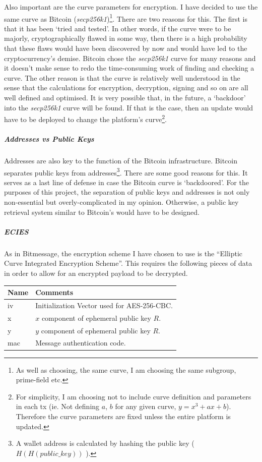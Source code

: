 \documentclass{article}
\begin{document}
Also important are the curve parameters for encryption. I have decided to use the same curve as Bitcoin (\textit{secp256k1}\cite{secp256k1})\footnote{As well as choosing, the same curve, I am choosing the same subgroup, prime-field etc.}. There are two reasons for this. The first is that it has been `tried and tested'. In other words, if the curve were to be majorly, cryptographically flawed in some way, then there is a high probability that these flaws would have been discovered by now and would have led to the cryptocurrency's demise. Bitcoin chose the \textit{secp256k1} curve for many reasons and it doesn't make sense to redo the time-consuming work of finding and checking a curve. The other reason is that the curve is relatively well understood in the sense that the calculations for encryption, decryption, signing and so on are all well defined and optimised. It is very possible that, in the future, a `backdoor' into the \textit{secp256k1} curve will be found. If that is the case, then an update would have to be deployed to change the platform's curve\footnote{For simplicity, I am choosing not to include curve definition and parameters in each tx (ie. Not defining $a$, $b$ for any given curve, $y=x^3+ax+b$). Therefore the curve parameters are fixed unless the entire platform is updated.}.

\subparagraph{Addresses vs Public Keys}\label{subpara:addrsvspubkeys}
Addresses are also key to the function of the Bitcoin infrastructure. Bitcoin separates public keys from addresses\footnote{A wallet address is calculated by hashing the public key ( $H(H(\textit{public\_key}))$ ).}. There are some good reasons for this. It serves as a last line of defense in case the Bitcoin curve is `backdoored'. For the purposes of this project, the separation of public keys and addresses is not only non-essential but overly-complicated in my opinion. Otherwise, a public key retrieval system similar to Bitcoin's would have to be designed.

\subparagraph{ECIES}
As in Bitmessage\cite{bitmessage_ecies}, the encryption scheme I have chosen to use is the ``Elliptic Curve Integrated Encryption Scheme''. This requires the following pieces of data in order to allow for an encrypted payload to be decrypted.
\begin{table}[H]
\centering
\begin{tabular}{|p{1.5cm}|p{8.5cm}|}
\hline
\rowcolor{tblgrey}
Name        & Comments              \\ \hline
iv          & Initialization Vector used for AES-256-CBC.   \\ \hline
x           & $x$ component of ephemeral public key $R$.    \\ \hline
y           & $y$ component of ephemeral public key $R$.    \\ \hline
mac         & Message authentication code.                  \\ \hline
\end{tabular}
\end{table}
\end{document}
